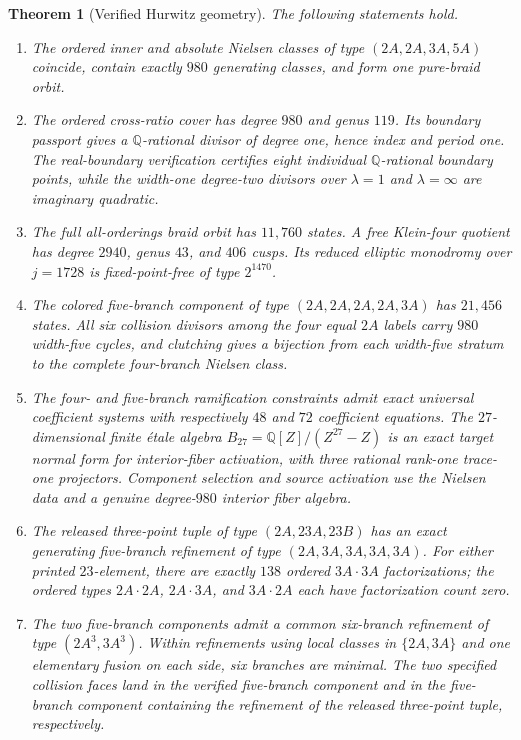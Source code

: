 \documentclass[11pt]{article}
\newtheorem{theorem}{Theorem}[section]
\theoremstyle{remark}
\newcommand{\Q}{\mathbb Q}
\begin{document}
\begin{theorem}[Verified Hurwitz geometry]\label{thm:main}
The following statements hold.
\begin{enumerate}[label=\textnormal{(\roman*)},leftmargin=2.4em]
\item The ordered inner and absolute Nielsen classes of type $(2A,2A,3A,5A)$ coincide, contain exactly $980$ generating classes, and form one pure-braid orbit.
\item The ordered cross-ratio cover has degree $980$ and genus $119$.  Its boundary passport gives a $\Q$-rational divisor of degree one, hence index and period one.  The real-boundary verification certifies eight individual $\Q$-rational boundary points, while the width-one degree-two divisors over $\lambda=1$ and $\lambda=\infty$ are imaginary quadratic.
\item The full all-orderings braid orbit has $11{,}760$ states.  A free Klein-four quotient has degree $2940$, genus $43$, and $406$ cusps.  Its reduced elliptic monodromy over $j=1728$ is fixed-point-free of type $2^{1470}$.
\item The colored five-branch component of type $(2A,2A,2A,2A,3A)$ has $21{,}456$ states.  All six collision divisors among the four equal $2A$ labels carry $980$ width-five cycles, and clutching gives a bijection from each width-five stratum to the complete four-branch Nielsen class.
\item The four- and five-branch ramification constraints admit exact universal coefficient systems with respectively $48$ and $72$ coefficient equations.  The $27$-dimensional finite \'etale algebra $B_{27}=\Q[Z]/(Z^{27}-Z)$ is an exact target normal form for interior-fiber activation, with three rational rank-one trace-one projectors.  Component selection and source activation use the Nielsen data and a genuine degree-$980$ interior fiber algebra.
\item The released three-point tuple of type $(2A,23A,23B)$ has an exact generating five-branch refinement of type $(2A,3A,3A,3A,3A)$.  For either printed $23$-element, there are exactly $138$ ordered $3A\cdot3A$ factorizations; the ordered types $2A\cdot2A$, $2A\cdot3A$, and $3A\cdot2A$ each have factorization count zero.
\item The two five-branch components admit a common six-branch refinement of type $(2A^3,3A^3)$.  Within refinements using local classes in $\{2A,3A\}$ and one elementary fusion on each side, six branches are minimal.  The two specified collision faces land in the verified five-branch component and in the five-branch component containing the refinement of the released three-point tuple, respectively.

\end{enumerate}
\end{theorem}
\end{document}
